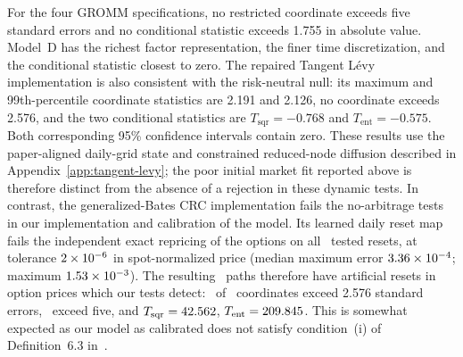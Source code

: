 \documentclass[smallextended,envcountsame,envcountsect]{svjour3}
\begin{document}
For the four GROMM specifications, no restricted coordinate exceeds five
standard errors and no conditional statistic exceeds 1.755 in absolute value.
Model~D has the richest factor representation, the finer time discretization,
and the conditional statistic closest to zero.  The repaired Tangent L\'evy
implementation is also consistent with the risk-neutral null: its maximum and
99th-percentile coordinate statistics are 2.191 and 2.126, no coordinate
exceeds 2.576, and the two conditional statistics are
$T_{\mathrm{sqr}}=-0.768$ and $T_{\mathrm{ent}}=-0.575$.  Both corresponding
95\% confidence intervals contain zero.  These results use the paper-aligned
daily-grid state and constrained reduced-node diffusion described in
Appendix~\ref{app:tangent-levy}; the poor initial market fit reported above is
therefore distinct from the absence of a rejection in these dynamic tests.
In contrast, the generalized-Bates CRC implementation fails the no-arbitrage tests
in our implementation and calibration of the model.
Its learned daily reset map fails the independent exact
repricing of the options on all \CrcResetGateSamples\ tested resets, at tolerance
  $2\times10^{-6}$ in spot-normalized price (median maximum error
$3.36\times10^{-4}$; maximum $1.53\times10^{-3}$).  The resulting
\CrcQPathCount\ paths
therefore have artificial resets in option prices which our tests detect:
\CrcQAboveTwoFiveSevenSix\ of \CrcQCoordinates\ coordinates exceed 2.576 standard
errors, \CrcQAboveFive\ exceed five, and $T_{\mathrm{sqr}}=42.562$,
$T_{\mathrm{ent}}=209.845$.  This is somewhat expected as our model as calibrated does not satisfy
condition~(i) of Definition~6.3 in~\citet{DysLitGambaraTeichmann2021}.
\end{document}
